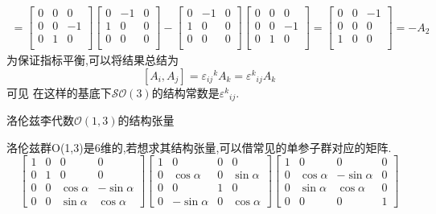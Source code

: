\documentclass[../main.tex]{subfiles}
\begin{document}
 \begin{align*}
 [A_1,A_3] = \begin{bmatrix}
     0&0&0\\    
     0&0&-1\\
     0&1&0\\    
 \end{bmatrix} \begin{bmatrix}
     0&-1&0\\    
     1&0&0\\
     0&0&0\\    
 \end{bmatrix}-
 \begin{bmatrix}
     0&-1&0\\    
     1&0&0\\
     0&0&0\\    
 \end{bmatrix} \begin{bmatrix}
     0&0&0\\    
     0&0&-1\\
     0&1&0\\    
 \end{bmatrix}= \begin{bmatrix}
     0&0&-1\\    
     0&0&0\\
     1&0&0\\    
 \end{bmatrix}
 =-A_2
 \end{align*}
 为保证指标平衡,可以将结果总结为$$[A_i,A_j] = \varepsilon_{ij}{}^kA_k = \varepsilon ^k{}_{ij}A_k$$可见
 在这样的基底下$\mathscr{SO}(3)$的结构常数是$\varepsilon^k{}_{ij}$.
 \begin{example}
洛伦兹李代数$\mathscr{O}(1,3)$的结构张量\label{ex:G-6-3}
 \end{example}
      洛伦兹群O(1,3)是6维的,若想求其结构张量,可以借常见的单参子群对应的矩阵.
      $$\begin{bmatrix}
      1 & 0 & 0 & 0 \\
      0 & 1 & 0 & 0 \\
      0 & 0 & \cos \alpha & -\sin \alpha \\
      0 & 0 & \sin \alpha & \cos \alpha
      \end{bmatrix}
      \begin{bmatrix}
      1 & 0 & 0 & 0 \\
      0 & \cos \alpha & 0 & \sin \alpha \\
      0 & 0 & 1 & 0 \\
      0 & -\sin \alpha & 0 & \cos \alpha
      \end{bmatrix}
      \begin{bmatrix}
      1 & 0 & 0 & 0 \\
      0 & \cos \alpha & -\sin \alpha & 0 \\
      0 & \sin \alpha & \cos \alpha & 0 \\
      0 & 0 & 0 & 1
      \end{bmatrix}$$
\end{document}
